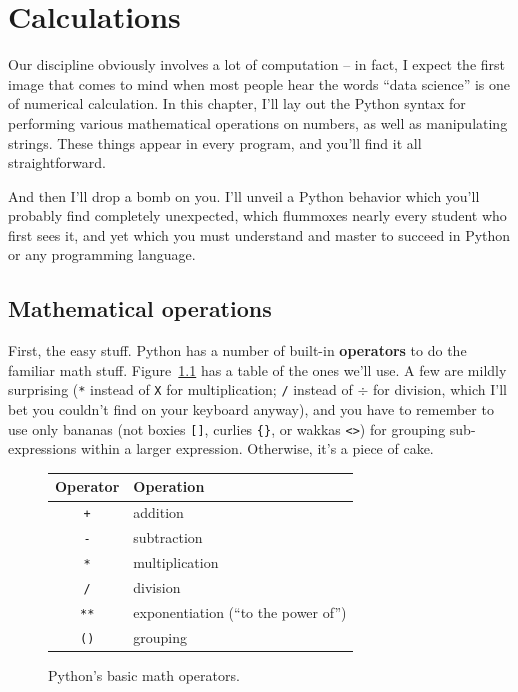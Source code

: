 

\chapter{Calculations}
\label{ch:calculations}

Our discipline obviously involves a lot of computation -- in fact, I expect the
first image that comes to mind when most people hear the words ``data science''
is one of numerical calculation. In this chapter, I'll lay out the Python
syntax for performing various mathematical operations on numbers, as well as
manipulating strings. These things appear in every program, and you'll find it
all straightforward.

And then I'll drop a bomb on you. I'll unveil a Python behavior which you'll
probably find completely unexpected, which flummoxes nearly every student who
first sees it, and yet which you must understand and master to succeed in
Python or any programming language.

\section{Mathematical operations}


First, the easy stuff. Python has a number of built-in \textbf{operators} to do
the familiar math stuff. Figure~\ref{fig:mathOps} has a table of the ones we'll
use. A few are mildly surprising (\texttt{*} instead of \texttt{X} for
multiplication; \texttt{/} instead of $\div$ for division, which I'll bet you
couldn't find on your keyboard anyway), and you have to remember to use only
bananas (not boxies \texttt{[]}, curlies \texttt{\{\}}, or wakkas \texttt{<>})
for grouping sub-expressions within a larger expression. Otherwise, it's a
piece of cake.

\begin{figure}[ht]
\centering
\begin{tabular}{c | l}
\hline
Operator & Operation \\
\hline
\texttt{+} & addition \\
\texttt{-} & subtraction \\
\texttt{*} & multiplication \\
\texttt{/} & division \\
\texttt{**} & exponentiation (``to the power of'')\\
\texttt{()} & grouping \\
\hline
\end{tabular}
\smallskip
\caption{Python's basic math operators.}
\label{fig:mathOps}
\end{figure}

